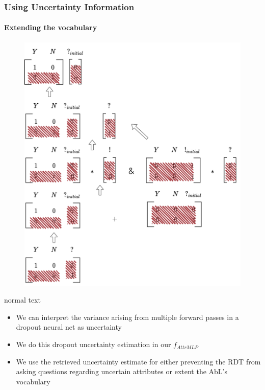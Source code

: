 \documentclass[9pt]{beamer}
\begin{document}
\begin{frame}
\frametitle{Using Uncertainty Information}
\framesubtitle{Extending the vocabulary}
\begin{figure}
	\includegraphics[width=0.6\linewidth]{images/extended_vocab_backward.pdf}
\end{figure}
\end{frame}



\begin{frame}[plain]{normal text}
\begin{itemize}
	\item We can interpret the variance arising from multiple forward passes in a dropout neural net as uncertainty
	\item We do this dropout uncertainty estimation in our $f_{AttrMLP}$
	\item We use the retrieved uncertainty estimate for either preventing the RDT from asking questions regarding uncertain attributes or extent the AbL's vocabulary
\end{itemize}
\end{frame}
\end{document}
